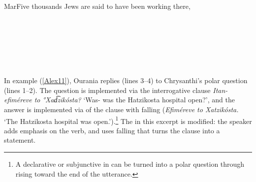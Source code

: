 \documentclass[output=paper]{LSP/langsci}
\begin{document}
\begin{Transcript}[FS {>}{>\hspace{0.1in}}]{Mar}{Five thousands Jews are said to have been working there,}
\label{Alex10}
\\
\\		
\\
 \\
\\
  \\ 
\\   
\end{Transcript}

In example (\ref{Alex11}), Ourania replies (lines 3--4) to Chrysanthi’s polar question (lines 1--2). The question is implemented via the interrogative clause \textit{Itan- efiméreve to °Xad͡zikósta?} `Was- was the Hatzikosta hospital open?', and the answer is implemented via  of the clause with falling  (\textit{Efiméreve to Xatzikósta.} `The Hatzikosta hospital was open.').\footnote{A declarative or subjunctive  in  can be turned into a polar question through rising  toward the end of the utterance.} The  in this excerpt is modified: the speaker adds emphasis on the verb, and uses falling  that turns the clause into a statement. 
\end{document}
